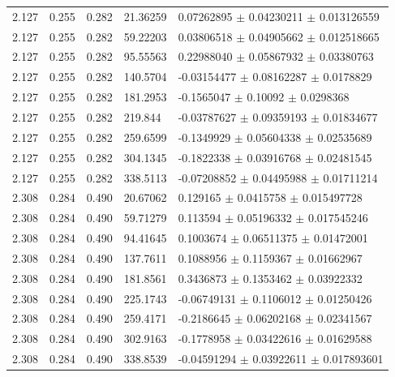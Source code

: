 \begin{table}[!h]
\begin{center}
\begin{tabular}{||l|l|l|l|l||}
  2.127 & 0.255 & 0.282  &   21.36259  &  0.07262895   $\pm$ 0.04230211    $\pm$  0.013126559   \\
  2.127 & 0.255 & 0.282  &   59.22203  &  0.03806518   $\pm$ 0.04905662    $\pm$  0.012518665   \\
  2.127 & 0.255 & 0.282  &   95.55563  &  0.22988040   $\pm$ 0.05867932    $\pm$  0.03380763    \\
  2.127 & 0.255 & 0.282  &   140.5704  &  -0.03154477  $\pm$ 0.08162287    $\pm$  0.0178829     \\
  2.127 & 0.255 & 0.282  &   181.2953  &  -0.1565047   $\pm$ 0.10092       $\pm$  0.0298368     \\
  2.127 & 0.255 & 0.282  &   219.844   &  -0.03787627  $\pm$ 0.09359193    $\pm$  0.01834677    \\
  2.127 & 0.255 & 0.282  &   259.6599  &  -0.1349929   $\pm$ 0.05604338    $\pm$  0.02535689    \\
  2.127 & 0.255 & 0.282  &   304.1345  &  -0.1822338   $\pm$ 0.03916768    $\pm$  0.02481545    \\
  2.127 & 0.255 & 0.282  &   338.5113  &  -0.07208852  $\pm$ 0.04495988    $\pm$  0.01711214    \\
 \hline                                                                          
  2.308 & 0.284 & 0.490 &    20.67062  &  0.129165     $\pm$ 0.0415758     $\pm$  0.015497728  \\
  2.308 & 0.284 & 0.490 &    59.71279  &  0.113594     $\pm$ 0.05196332    $\pm$  0.017545246  \\
  2.308 & 0.284 & 0.490 &    94.41645  &  0.1003674    $\pm$ 0.06511375    $\pm$  0.01472001   \\
  2.308 & 0.284 & 0.490 &    137.7611  &  0.1088956    $\pm$ 0.1159367     $\pm$  0.01662967   \\
  2.308 & 0.284 & 0.490 &    181.8561  &  0.3436873    $\pm$ 0.1353462     $\pm$  0.03922332   \\
  2.308 & 0.284 & 0.490 &    225.1743  &  -0.06749131  $\pm$ 0.1106012     $\pm$  0.01250426   \\
  2.308 & 0.284 & 0.490 &    259.4171  &  -0.2186645   $\pm$ 0.06202168    $\pm$  0.02341567   \\
  2.308 & 0.284 & 0.490 &    302.9163  &  -0.1778958   $\pm$ 0.03422616    $\pm$  0.01629588   \\
  2.308 & 0.284 & 0.490 &    338.8539  &  -0.04591294  $\pm$ 0.03922611    $\pm$  0.017893601  \\
 \hline                         

\end{tabular}
\end{center}
\end{table}
